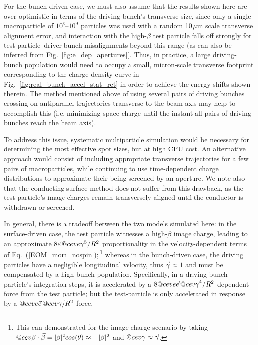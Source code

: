 \documentclass[reprint,
               amsmath,amssymb,nofootinbib, aps%
              ]{revtex4-2}
\makeatletter
\DeclareRobustCommand{\cev}[1]{%
  {\mathpalette\do@cev{#1}}%
}
\newcommand{\do@cev}[2]{%
  \vbox{\offinterlineskip
    \sbox\z@{$\m@th#1 x$}%
    \ialign{##\cr
      \hidewidth\reflectbox{$\m@th#1\vec{}\mkern4mu$}\hidewidth\cr
      \noalign{\kern-\ht\z@}
      $\m@th#1#2$\cr
    }%
  }%
}
\makeatother
\begin{document}
For the bunch-driven case, we must also assume that the results shown here are over-optimistic in terms of the driving bunch's transverse size, since only a single macroparticle of $10^8$--$10^9$ particles was used with a random 10\,{$\mu$}m scale transverse alignment error, and interaction with the high-$\beta$ test particle falls off strongly for test particle--driver bunch misalignments beyond this range (as can also be inferred from Fig.~\ref{fig:e_dep_apertures}). Thus, in practice, a large driving-bunch population would need to occupy a small, micron-scale transverse footprint corresponding to the charge-density curve in Fig.~\ref{fig:real_bunch_accel_stat_ret} in order to achieve the energy shifts shown therein. The method mentioned above of using several pairs of driving bunches crossing on antiparallel trajectories transverse to the beam axis may help to accomplish this (i.e. minimizing space charge until the instant all pairs of driving bunches reach the beam axis).

To address this issue, systematic multiparticle simulation would be necessary for determining the most effective spot sizes, but at high CPU cost. An alternative approach would consist of including appropriate transverse trajectories for a few pairs of macroparticles, while continuing to use time-dependent charge distributions to approximate their being screened by an aperture. We note also that the conducting-surface method does not suffer from this drawback, as the test particle's image charges remain transversely aligned until the conductor is withdrawn or screened.

In general, there is a tradeoff between the two models simulated here: in the surface-driven case, the test particle witnesses a high-$\beta$ image charge, leading to an approximate $8\vec{e}\,\cev{e}\gamma^5 / R^2$ proportionality in the velocity-dependent terms of Eq.~(\ref{EOM_mom_nospin});\,\footnote{This can demonstrated for the image-charge scenario by taking $\cev{\beta}\cdot\vec{\beta}=|\beta|^2 cos(\theta) \approx -|\beta|^2$ and $\cev{\gamma}\approx\vec{\gamma}$.} whereas in the bunch-driven case, the driving particles have a negligible longitudinal velocity, thus $\vec{\gamma}\approx 1$ and must be compensated by a high bunch population. Specifically, in a driving-bunch particle's integration steps, it is accelerated by a $8\cev{e}\vec{e}\,\cev{\gamma}^4 / R^2$ dependent force from the test particle; but the test-particle is only accelerated in response by a $\cev{e}\vec{e}\,\cev{\gamma} / R^2$ force.
\end{document}
